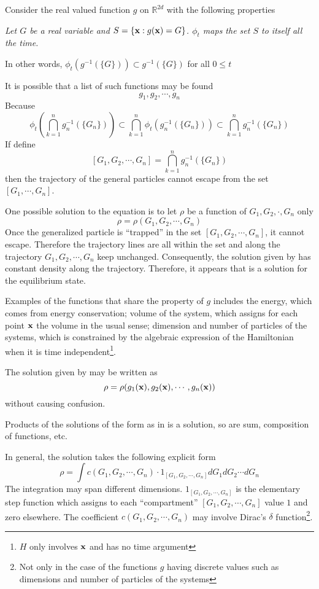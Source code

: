 Consider the real valued function $g$ on $\mathbb R^{2d}$ with the following properties

{\itshape Let $G$ be a real variable and $S=\{\mathbf{x} : g(\mathbf{x})=G\}$. $\phi_t$ maps the set $S$ to itself all the time.

In other words, $\phi_t(g^{-1}(\{G\}))\subset g^{-1}(\{G\})$ for all $0\leq t$ }

It is possible that a list of such functions may be found
\[
    g_1, g_2,\cdots ,g_n
    \]
Because
\[
    \phi_t(\bigcap_{k=1}^{n}g_n^{-1}(\{G_n\}))\subset \bigcap_{k=1}^{n}\phi_t(g_n^{-1}(\{G_n\}))\subset\bigcap_{k=1}^{n}g_n^{-1}(\{G_n\})
    \]
If define\[
    [G_1,G_2,\cdots ,G_n]=\bigcap_{k=1}^{n}g_n^{-1}(\{G_n\})
    \]
    then the trajectory of the general particles cannot escape from the set $[G_1,\cdots ,G_n]$.

One possible solution to the equation  is to let $\rho$ be a function of $G_1,G_2,\cdot ,G_n$ only
\begin{equation}\label{sol}
\rho=\rho(G_1,G_2,\cdots ,G_n)
\end{equation}
Once the generalized particle is ``trapped'' in the set $[G_1,G_2,\cdots ,G_n]$, it cannot escape. Therefore the trajectory lines are all within the set and along the trajectory $G_1,G_2,\cdots ,G_n$ keep unchanged.
Consequently, the solution given by  has constant density along the trajectory. Therefore, it appears that  is a solution for the equilibrium state.

Examples of the functions that share the property of $g$ includes the energy, which comes from energy conservation; volume of the system, which assigns for each point $\mathbf{x}$ the volume in the usual sense; dimension and number of particles of the systems, which is constrained by the algebraic expression of the Hamiltonian when it is time independent\footnote{$H$ only involves $\mathbf{x}$ and has no time argument }.

The solution given by  may be written as
\begin{equation}\label{sol2}
\rho=\rho(g_1(\mathbf{x}),g_2(\mathbf{x}),\cdots ,g_n(\mathbf{x}))
\end{equation}
without causing confusion.

Products of the solutions of the form as in  is a solution, so are sum, composition of functions, etc. 

In general, the solution takes the following explicit form
\begin{equation}\label{sol3}
\rho=\int c(G_1,G_2,\cdots ,G_n)\cdot 1_{[G_1,G_2,\cdots ,G_n]}dG_1dG_2\cdots dG_n
\end{equation}
The integration may span different dimensions. $1_{[G_1,G_2,\cdots ,G_n]}$ is the elementary step function which assigns to each ``compartment'' $[G_1,G_2,\cdots ,G_n]$ value $1$ and zero elsewhere.
The coefficient $c(G_1,G_2,\cdots ,G_n)$ may involve Dirac's $\delta$ function\footnote{Not only in the case of the functions $g$ having discrete values such as dimensions and number of particles of the systems}.

